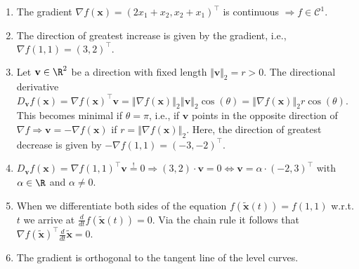 %
\begin{enumerate}
  \item The gradient $\nabla f(\mathbf{x}) = (2x_1 + x_2, x_2 + x_1)^\top$ is continuous $\Rightarrow f \in \mathcal{C}^1$.
	\item The direction of greatest increase is given by the gradient, i.e., $\nabla f(1,1) = (3,2)^\top.$
	\item Let $\mathbf{v} \in \R^2$ be a direction with fixed length $\Vert \mathbf{v}\Vert_2 = r > 0$. \newline The directional derivative $D_{\mathbf{v}}f(\mathbf{x}) = \nabla f(\mathbf{x})^\top \mathbf{v} = \left\Vert \nabla f(\mathbf{x}) \right\Vert_2 \left\Vert \mathbf{v} \right\Vert_2 \cos (\theta) = \left\Vert \nabla f(\mathbf{x}) \right\Vert_2 r \cos (\theta).$ This becomes minimal if $\theta = \pi$, i.e., if $\mathbf{v}$ points in the opposite direction of $\nabla f \Rightarrow \mathbf{v} = -\nabla f(\mathbf{x})$ if $r = \left\Vert \nabla f (\mathbf{x}) \right\Vert_2.$ 
	Here, the direction of greatest decrease is given by $-\nabla f(1,1) = (-3, -2)^\top$.
	\item $D_{\mathbf{v}}f(\mathbf{x}) = \nabla f(1, 1)^\top \mathbf{v} \overset{!}{=} 0 \Rightarrow (3,2) \cdot \mathbf{v} = 0 \iff \mathbf{v} = \alpha \cdot (-2, 3)^\top$ with $\alpha \in \R$ and $\alpha \neq 0.$
	
	\item When we differentiate both sides of the equation $f(\tilde{\mathbf{x}}(t)) = f(1,1)$  w.r.t. $t$ we arrive at $\frac{d}{dt} f(\tilde{\mathbf{x}}(t)) = 0$.
	Via the chain rule it follows that $\nabla f(\tilde{\mathbf{x}})^\top \frac{d}{dt}\tilde{\mathbf{x}} = 0.$
	\item The gradient is orthogonal to the tangent line of the level curves.
	  
\end{enumerate}
